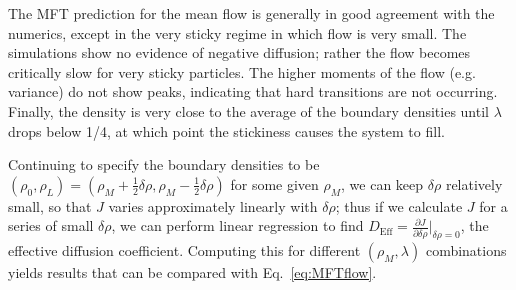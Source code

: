 \documentclass[
reprint,
 amsmath,amssymb,
 aps,
 prl,
]{revtex4-1}
\newcommand{\partDeriv}[2]{\frac{\partial #1}{\partial #2}}
\begin{document}
\begin{figure}[h!]
\begin{center}
\begin{tabular}{c}
    \end{tabular}
\end{center}
    \vspace{-2.5em}
\end{figure}
The MFT prediction for the mean flow is generally in good agreement with the numerics, except in the very sticky regime in which flow is very small.
The simulations show no evidence of negative diffusion; rather the flow becomes critically slow for very sticky particles.
The higher moments of the flow (e.g. variance) do not show peaks, indicating that hard transitions are not occurring.
Finally, the density is very close to the average of the boundary densities until $\lambda$ drops below 1/4, at which point the stickiness causes the system to fill.

Continuing to specify the boundary densities to be $(\rho_0, \rho_L) = (\rho_M + \frac{1}{2} \delta\rho, \rho_M - \frac{1}{2} \delta\rho)$ for some given $\rho_M$, we can keep $\delta\rho$ relatively small, so that $J$ varies approximately
linearly with $\delta\rho$; thus if we calculate $J$ for a series of small $\delta \rho$, we can perform linear regression to find $D_\mathrm{Eff}=\partDeriv{J}{\delta\rho}\big|_{\delta\rho=0}$, the effective diffusion coefficient.
Computing this for different $(\rho_M, \lambda)$ combinations yields results that can be compared with Eq.~\ref{eq:MFTflow}.
\end{document}
